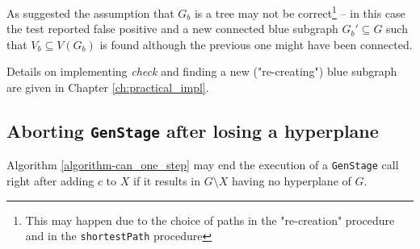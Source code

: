 As suggested the assumption that $G_b$ is a tree may not be correct\footnote{This may happen due to the choice of paths in the "re-creation" procedure and in the \lstinline|shortestPath| procedure} -- in this case the test reported false positive and a new connected blue subgraph $G_b' \subseteq G$ such that $V_b \subseteq V(G_b)$ is found although the previous one might have been connected.

Details on implementing \textit{check} and finding a new ("re-creating") blue subgraph are given in Chapter \ref{ch:practical_impl}.

\subsection*{Aborting \lstinline|GenStage| after losing a hyperplane}

\begin{claim}
	Algorithm \ref{algorithm-can_one_step} may end the execution of a \lstinline|GenStage| call right after adding $c$ to $X$ if it results in $G \setminus X$ having no hyperplane of $G$.
\end{claim}


\clearpage

